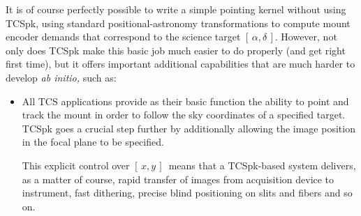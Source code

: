 \documentclass[12pt,fleqn,twoside]{article}
\renewcommand{\_}{{\tt\char'137}}     %
\newcommand{\radec}     {$[\,\alpha,\delta\,]$}
\newcommand{\xy}        {$[\,x,y\,]$}
\begin{document}
It is of course perfectly possible to write a simple pointing kernel
without using TCSpk, using standard positional-astronomy
transformations to compute mount encoder demands that
correspond to the science target \radec.  However, not only does
TCSpk make this basic job
much easier to do properly (and get right first time),
but it offers important
additional capabilities that
are much harder to develop {\it ab initio,} such as:

\begin{itemize}
\item All TCS applications provide as their basic function the
      ability to point and track the mount in order to
      follow the sky coordinates of a specified target.  TCSpk
      goes a crucial step further by
      additionally allowing the image position in
      the focal plane to be specified.

      This explicit control over \xy\ means that a TCSpk-based
      system delivers, as a matter of course, rapid
      transfer of images
      from acquisition device to instrument, fast dithering,
      precise blind positioning on slits and fibers and so on.


\end{itemize}
\end{document}
